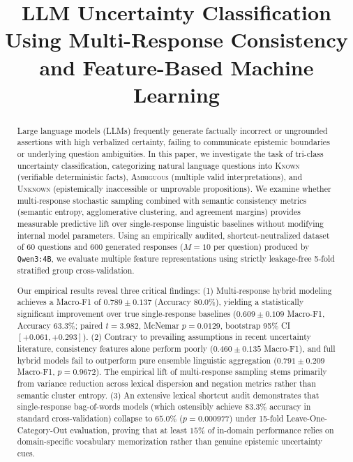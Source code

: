 \documentclass[conference]{IEEEtran}
\begin{document}
\title{LLM Uncertainty Classification Using Multi-Response Consistency and Feature-Based Machine Learning}

\author{
}

\maketitle

\begin{abstract}
Large language models (LLMs) frequently generate factually incorrect or ungrounded assertions with high verbalized certainty, failing to communicate epistemic boundaries or underlying question ambiguities. In this paper, we investigate the task of tri-class uncertainty classification, categorizing natural language questions into \textsc{Known} (verifiable deterministic facts), \textsc{Ambiguous} (multiple valid interpretations), and \textsc{Unknown} (epistemically inaccessible or unprovable propositions). We examine whether multi-response stochastic sampling combined with semantic consistency metrics (semantic entropy, agglomerative clustering, and agreement margins) provides measurable predictive lift over single-response linguistic baselines without modifying internal model parameters. Using an empirically audited, shortcut-neutralized dataset of 60 questions and 600 generated responses ($M=10$ per question) produced by \texttt{Qwen3:4B}, we evaluate multiple feature representations using strictly leakage-free 5-fold stratified group cross-validation. 

Our empirical results reveal three critical findings: (1) Multi-response hybrid modeling achieves a Macro-F1 of $0.789 \pm 0.137$ (Accuracy $80.0\%$), yielding a statistically significant improvement over true single-response baselines ($0.609 \pm 0.109$ Macro-F1, Accuracy $63.3\%$; paired $t=3.982$, McNemar $p=0.0129$, bootstrap 95\% CI $[+0.061, +0.293]$). (2) Contrary to prevailing assumptions in recent uncertainty literature, consistency features alone perform poorly ($0.460 \pm 0.135$ Macro-F1), and full hybrid models fail to outperform pure ensemble linguistic aggregation ($0.791 \pm 0.209$ Macro-F1, $p=0.9672$). The empirical lift of multi-response sampling stems primarily from variance reduction across lexical dispersion and negation metrics rather than semantic cluster entropy. (3) An extensive lexical shortcut audit demonstrates that single-response bag-of-words models (which ostensibly achieve $83.3\%$ accuracy in standard cross-validation) collapse to $65.0\%$ ($p=0.000977$) under 15-fold Leave-One-Category-Out evaluation, proving that at least $15\%$ of in-domain performance relies on domain-specific vocabulary memorization rather than genuine epistemic uncertainty cues.
\end{abstract}
\end{document}
